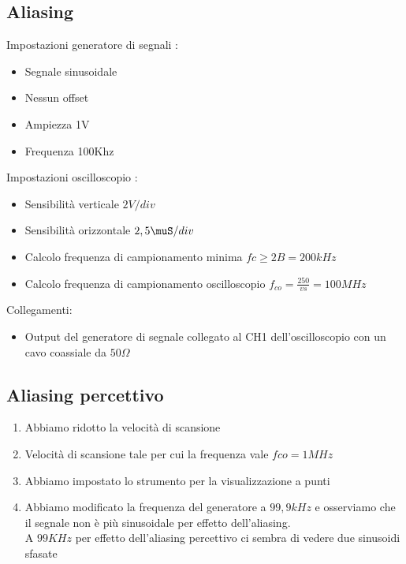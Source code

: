 \documentclass[a4paper]{article}
\begin{document}
\begin{tcolorbox}[breakable,colback=cyan,colframe=cyan]
\section*{Aliasing}
\end{tcolorbox}

Impostazioni generatore di segnali :
\begin{itemize}
\item Segnale sinusoidale
\item Nessun offset
\item Ampiezza 1V
\item Frequenza 100Khz
\end{itemize}

Impostazioni oscilloscopio :
\begin{itemize}
\item Sensibilità verticale \(2 V/div\)
\item Sensibilità orizzontale \(2,5 \muS/div \) 
\item Calcolo frequenza di campionamento minima \(fc \geq 2B = 200 kHz\)
\item Calcolo frequenza di campionamento oscilloscopio \(f_{co}=\tfrac{250}{vs}= 100 MHz\)
\end{itemize}

Collegamenti:
\begin{itemize}
\item Output del generatore di segnale collegato al CH1 dell'oscilloscopio con un cavo coassiale da \(50 \Omega\)  
\end{itemize}


\subsection{Aliasing percettivo}
 \begin{enumerate}
  \item Abbiamo ridotto la velocità di scansione
  \item Velocità di scansione tale per cui la frequenza vale \(fco= 1 MHz\)
  \item Abbiamo impostato lo strumento per la visualizzazione a punti
  \item Abbiamo modificato la frequenza del generatore a \(99,9 kHz\) e osserviamo che il segnale non è più sinusoidale per effetto dell'aliasing. \\ A \(99 KHz\) per effetto dell'aliasing percettivo ci sembra di vedere due sinusoidi sfasate 
 \end{enumerate}
\end{document}
